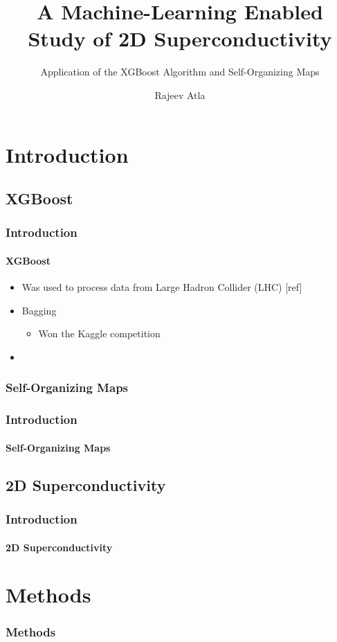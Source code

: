 \documentclass[12pt]{beamer}
\title{A Machine-Learning Enabled Study of 2D Superconductivity}
\subtitle{Application of the XGBoost Algorithm and Self-Organizing Maps}
\author[Rajeev Atla]
{Rajeev Atla}
\institute[JPS]
{
  John P. Stevens High School
}
\begin{document}
\frame{\titlepage}

\section{Introduction}
\subsection{XGBoost}



\begin{frame}
\frametitle{Introduction}
\framesubtitle{XGBoost}

\begin{itemize}
  \item Was used to process data from Large Hadron Collider (LHC) [ref]
  \item Bagging
  \begin{itemize}
    \item Won the Kaggle competition
  \end{itemize}
  \item
\end{itemize}


\end{frame}

\subsubsection{Self-Organizing Maps}

\begin{frame}
\frametitle{Introduction}
\framesubtitle{Self-Organizing Maps}

\end{frame}

\subsection{2D Superconductivity}

\begin{frame}
\frametitle{Introduction}
\framesubtitle{2D Superconductivity}

\end{frame}




\section{Methods}

\begin{frame}
\frametitle{Methods}

\end{frame}
\end{document}
